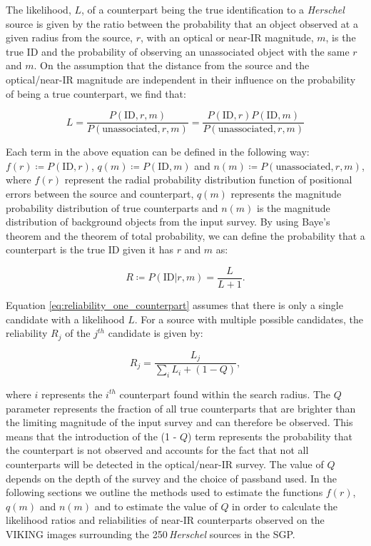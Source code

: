 The likelihood, $L$, of a counterpart being the true identification to a \textit{Herschel} source is given by the ratio between the probability that an object observed at a given radius from the source, $r$, with an optical or near-IR magnitude, $m$, is the true ID and the probability of observing an unassociated object with the same $r$ and $m$. On the assumption that the distance from the source and the optical/near-IR magnitude are independent in their influence on the probability of being a true counterpart, we find that:

\begin{equation}
\label{eq:likelihood_ratio}
    L = \frac{P(\textrm{ID}, r, m)}{P(\textrm{unassociated}, r, m)} = \frac{P(\textrm{ID}, r) P(\textrm{ID}, m)}{P(\textrm{unassociated}, r, m)}
\end{equation}

Each term in the above equation can be defined in the following way: $f(r) \coloneqq P(\textrm{ID}, r)$, $q(m) \coloneqq P(\textrm{ID}, m)$ and $n(m) \coloneqq P(\textrm{unassociated}, r, m)$, where $f(r)$ represent the radial probability distribution function of positional errors between the source and counterpart, $q(m)$ represents the magnitude probability distribution of true counterparts and $n(m)$ is the magnitude distribution of background objects from the input survey. By using Baye's theorem and the theorem of total probability, we can define the probability that a counterpart is the true ID given it has $r$ and $m$ as:

\begin{equation}
\label{eq:reliability_one_counterpart}
    R \coloneqq P(\textrm{ID}| r, m) = \frac{L}{L+1}.
\end{equation}

Equation \ref{eq:reliability_one_counterpart} assumes that there is only a single candidate with a likelihood $L$. For a source with multiple possible candidates, the reliability $R_j$ of the $j^{th}$ candidate is given by:

\begin{equation}
    \label{eq:reliability_multiple_counterparts}
        R_j = \frac{L_j}{\sum_i L_i + (1-Q)},
\end{equation}

where $i$ represents the $i^{th}$ counterpart found within the search radius. The $Q$ parameter represents the fraction of all true counterparts that are brighter than the limiting magnitude of the input survey and can therefore be observed. This means that the introduction of the (1 - $Q$) term represents the probability that the counterpart is not observed and accounts for the fact that not all counterparts will be detected in the optical/near-IR survey. The value of $Q$ depends on the depth of the survey and the choice of passband used. In the following sections we outline the methods used to estimate the functions $f(r)$, $q(m)$ and $n(m)$ and to estimate the value of $Q$ in order to calculate the likelihood ratios and reliabilities of near-IR counterparts observed on the VIKING images surrounding the 250\,\micron \textit{Herschel} sources in the SGP.

